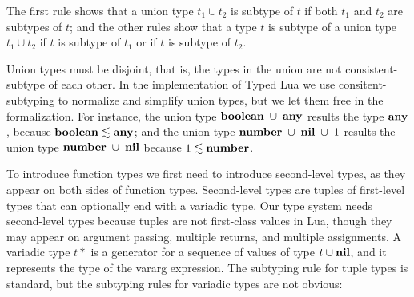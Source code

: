 The first rule shows that a union type $t_{1} \cup t_{2}$
is subtype of $t$ if both $t_{1}$ and $t_{2}$ are subtypes
of $t$;
and the other rules show that a type $t$ is subtype
of a union type $t_{1} \cup t_{2}$ if $t$ is subtype of
$t_{1}$ or if $t$ is subtype of $t_{2}$.

Union types must be disjoint, that is, the types in the union are not
consistent-subtype of each other.
In the implementation of Typed Lua we use consitent-subtyping to
normalize and simplify union types, but we let them free in the
formalization.
For instance, the union type $\mathbf{boolean} \;\cup\; \mathbf{any}$ results the
type $\mathbf{any}$, because $\mathbf{boolean} \lesssim \mathbf{any}$;
and the union type $\mathbf{number} \;\cup\; \mathbf{nil} \;\cup\; 1$ results the union
type $\mathbf{number} \;\cup\; \mathbf{nil}$ because $1 \lesssim \mathbf{number}$.

To introduce function types we first need to introduce
second-level types, as they appear on both sides of function types.
Second-level types are tuples of first-level types
that can optionally end with a variadic type.
Our type system needs second-level types because tuples are
not first-class values in Lua, though they may appear on
argument passing, multiple returns, and multiple assignments.
A variadic type $t*$ is a generator for a sequence of values of
type $t \cup \mathbf{nil}$, and it represents the type of the vararg
expression.
The subtyping rule for tuple types is standard, but the subtyping
rules for variadic types are not obvious:
